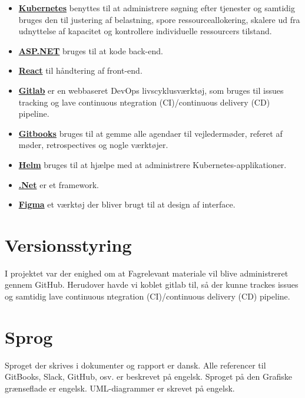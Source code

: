 \begin{itemize}
    \item \underline{\textbf{ Kubernetes}} benyttes til at administrere søgning efter tjenester og samtidig bruges den til justering af belastning, spore ressourceallokering, skalere ud fra udnyttelse af kapacitet og kontrollere individuelle ressourcers tilstand.
    \item \underline{\textbf{ ASP.NET}} bruges til at kode back-end.
    \item \underline{\textbf{ React}} til håndtering af front-end.
    \item \underline{\textbf{ Gitlab}} er en webbaseret DevOps livscyklusværktøj, som bruges til issues tracking og lave continuous ntegration (CI)/continuous delivery (CD) pipeline. 
    \item \underline{\textbf{ Gitbooks}} bruges til at gemme alle agendaer til vejledermøder, referet af møder, retrospectives og nogle værktøjer.
    \item \underline{\textbf{ Helm}} bruges til at hjælpe med at administrere Kubernetes-applikationer.
    \item \underline{\textbf{ .Net}} er et framework.
    \item \underline{\textbf{ Figma}} et værktøj der bliver brugt til at design af interface.
   
  
\end{itemize}


\section{Versionsstyring}
I projektet var der enighed om at Fagrelevant materiale vil blive administreret gennem GitHub. Herudover havde vi koblet gitlab til, så der kunne trackes issues og samtidig lave continuous ntegration (CI)/continuous delivery (CD) pipeline.

\section{Sprog}

Sproget der skrives i dokumenter og rapport er dansk. Alle referencer til GitBooks, Slack, GitHub, osv. er beskrevet på engelsk. Sproget på den Grafiske grænseflade er engelsk. UML-diagrammer er skrevet på engelsk.